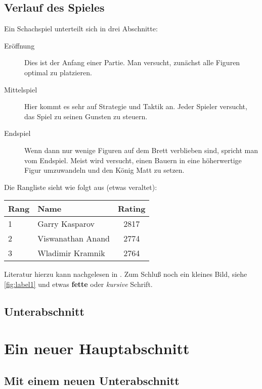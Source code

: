 \begin{refsection}
\subsection{Verlauf des Spieles}
%
Ein Schachspiel unterteilt sich in drei Abschnitte:
%
\begin{description}
  \item[Eröffnung] 
  Dies ist der Anfang einer Partie. 
  Man versucht, zunächst alle Figuren optimal zu platzieren.
  
  \item[Mittelspiel] 
  Hier kommt es sehr auf Strategie und Taktik an. 
  Jeder Spieler versucht, das Spiel zu seinen Gunsten zu steuern.
  
  \item[Endspiel] 
  Wenn dann nur wenige Figuren auf dem Brett verblieben sind, spricht man vom Endspiel. 
  Meist wird versucht, einen Bauern in eine höherwertige Figur umzuwandeln und den König Matt zu setzen.
\end{description}
Die Rangliste sieht wie folgt aus (etwas veraltet):
\begin{center}
  \begin{tabular}{llc}
    Rang & Name              & Rating \\\hline
    1    & Garry Kasparov    & 2817   \\
    2    & Viswanathan Anand & 2774   \\
    3    & Wladimir Kramnik  & 2764
  \end{tabular}
\end{center}
Literatur hierzu kann nachgelesen in \textcite{brunel:1999}. 
Zum Schluß noch ein kleines Bild, siehe \vref{fig:label1} und etwas \textbf{fette} oder \emph{kursive} Schrift.

\subsection{Unterabschnitt}
\blindtext[2]

\section*{Ein neuer Hauptabschnitt}
\subsection{Mit einem neuen Unterabschnitt}
\lipsum[1-3]



% 
\printbibliography
\end{refsection}

